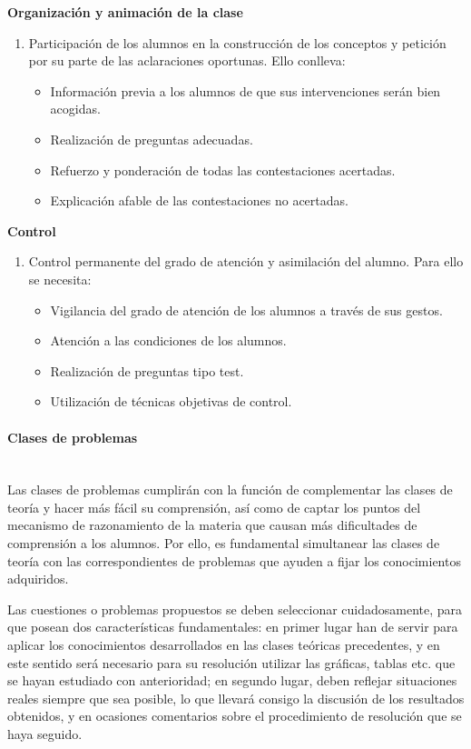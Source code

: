 \textbf{Organización y animación de la clase}
\begin{enumerate}
\item Participación de los alumnos en la construcción de los conceptos y petición por su parte de las aclaraciones oportunas. Ello conlleva:
\begin{itemize}
\item Información previa a los alumnos de que sus intervenciones serán bien acogidas.
\item Realización de preguntas adecuadas.
\item Refuerzo y ponderación de todas las contestaciones acertadas.
\item Explicación afable de las contestaciones no acertadas.
\end{itemize}
\end{enumerate}

\textbf{Control}
\begin{enumerate}
\item Control permanente del grado de atención y asimilación del alumno. Para ello se necesita:
\begin{itemize}
\item Vigilancia del grado de atención de los alumnos a través de sus gestos.
\item Atención a las condiciones de los alumnos.
\item Realización de preguntas tipo test.
\item Utilización de técnicas objetivas de control.
\end{itemize}
\end{enumerate}


\paragraph{Clases de problemas\\\\}

Las clases de problemas cumplirán con la función de complementar las clases de teoría y hacer más fácil su comprensión, así como de captar los puntos del mecanismo de razonamiento de la materia que causan más dificultades de comprensión a los alumnos. Por ello, es fundamental simultanear las clases de teoría con las correspondientes de problemas que ayuden a fijar los conocimientos adquiridos.


Las cuestiones o problemas propuestos se deben seleccionar cuidadosamente, para que posean dos características fundamentales: en primer lugar han de servir para aplicar los conocimientos desarrollados en las clases teóricas precedentes, y en este sentido será necesario para su resolución utilizar las gráficas, tablas etc. que se hayan estudiado con anterioridad; en segundo lugar, deben reflejar situaciones reales siempre que sea posible, lo que llevará consigo la discusión de los resultados obtenidos, y en ocasiones comentarios sobre el procedimiento de resolución que se haya seguido.

